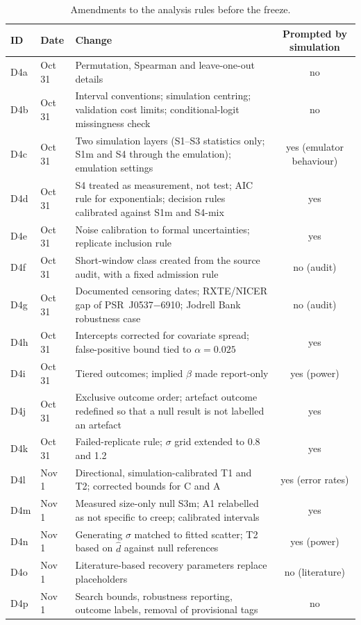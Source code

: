 \documentclass[fleqn,usenatbib]{mnras}
\newcommand{\dhat}{\hat d}
\newcommand{\psr}[1]{PSR~#1}
\begin{document}
\begin{table}
\centering
\caption{Amendments to the analysis rules before the freeze.}
\label{tab:amend}
\small
\begin{tabular}{@{}llp{11.2cm}c@{}}
\toprule
ID & Date & Change & Prompted by simulation\\
\midrule
D4a & Oct 31 & Permutation, Spearman and leave-one-out details & no\\
D4b & Oct 31 & Interval conventions; simulation centring; validation cost limits; conditional-logit missingness check & no\\
D4c & Oct 31 & Two simulation layers (S1--S3 statistics only; S1m and S4 through the emulation); emulation settings & yes (emulator behaviour)\\
D4d & Oct 31 & S4 treated as measurement, not test; AIC rule for exponentials; decision rules calibrated against S1m and S4-mix & yes\\
D4e & Oct 31 & Noise calibration to formal uncertainties; replicate inclusion rule & yes\\
D4f & Oct 31 & Short-window class created from the source audit, with a fixed admission rule & no (audit)\\
D4g & Oct 31 & Documented censoring dates; RXTE/NICER gap of \psr{J0537$-$6910}; Jodrell Bank robustness case & no (audit)\\
D4h & Oct 31 & Intercepts corrected for covariate spread; false-positive bound tied to $\alpha=0.025$ & yes\\
D4i & Oct 31 & Tiered outcomes; implied $\beta$ made report-only & yes (power)\\
D4j & Oct 31 & Exclusive outcome order; artefact outcome redefined so that a null result is not labelled an artefact & yes\\
D4k & Oct 31 & Failed-replicate rule; $\sigma$ grid extended to 0.8 and 1.2 & yes\\
D4l & Nov 1 & Directional, simulation-calibrated T1 and T2; corrected bounds for C and A & yes (error rates)\\
D4m & Nov 1 & Measured size-only null S3m; A1 relabelled as not specific to creep; calibrated intervals & yes\\
D4n & Nov 1 & Generating $\sigma$ matched to fitted scatter; T2 based on $\dhat$ against null references & yes (power)\\
D4o & Nov 1 & Literature-based recovery parameters replace placeholders & no (literature)\\
D4p & Nov 1 & Search bounds, robustness reporting, outcome labels, removal of provisional tags & no\\
\bottomrule
\end{tabular}
\end{table}
\end{document}
